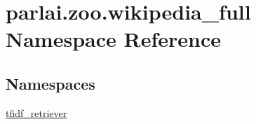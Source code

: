 \hypertarget{namespaceparlai_1_1zoo_1_1wikipedia__full}{}\section{parlai.\+zoo.\+wikipedia\+\_\+full Namespace Reference}
\label{namespaceparlai_1_1zoo_1_1wikipedia__full}
\subsection*{Namespaces}
\begin{DoxyCompactItemize}
\item 
 \hyperlink{namespaceparlai_1_1zoo_1_1wikipedia__full_1_1tfidf__retriever}{tfidf\+\_\+retriever}
\end{DoxyCompactItemize}
